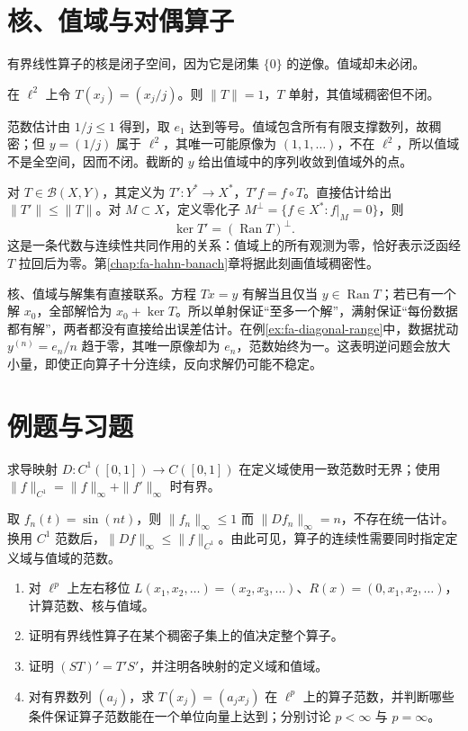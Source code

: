 \documentclass[UTF8,12pt,a4paper,fontset=fandol]{ctexbook}
\begin{document}
\section{核、值域与对偶算子}
有界线性算子的核是闭子空间，因为它是闭集 $\{0\}$ 的逆像。值域却未必闭。
\begin{example}\label{ex:fa-diagonal-range}
在 $\ell^2$ 上令 $T(x_j)=(x_j/j)$。则 $\|T\|=1$，$T$ 单射，其值域稠密但不闭。
\end{example}
\begin{solve}
范数估计由 $1/j\leq1$ 得到，取 $e_1$ 达到等号。值域包含所有有限支撑数列，故稠密；但 $y=(1/j)$ 属于 $\ell^2$，其唯一可能原像为 $(1,1,\ldots)$，不在 $\ell^2$，所以值域不是全空间，因而不闭。截断的 $y$ 给出值域中的序列收敛到值域外的点。
\end{solve}

对 $T\in\mathcal B(X,Y)$，其定义为 $T':Y^*\to X^*$，$T'f=f\circ T$。直接估计给出 $\|T'\|\leq\|T\|$。对 $M\subset X$，定义零化子 $M^\perp=\{f\in X^*:f|_M=0\}$，则
\[
 \ker T'=(\operatorname{Ran}T)^\perp.
\]
这是一条代数与连续性共同作用的关系：值域上的所有观测为零，恰好表示泛函经 $T$ 拉回后为零。第\ref{chap:fa-hahn-banach}章将据此刻画值域稠密性。

核、值域与解集有直接联系。方程 $Tx=y$ 有解当且仅当 $y\in\operatorname{Ran}T$；若已有一个解 $x_0$，全部解恰为 $x_0+\ker T$。所以单射保证“至多一个解”，满射保证“每份数据都有解”，两者都没有直接给出误差估计。在例\ref{ex:fa-diagonal-range}中，数据扰动 $y^{(n)}=e_n/n$ 趋于零，其唯一原像却为 $e_n$，范数始终为一。这表明逆问题会放大小量，即使正向算子十分连续，反向求解仍可能不稳定。

\section{例题与习题}
\begin{example}[求导与定义域范数]
求导映射 $D:C^1([0,1])\to C([0,1])$ 在定义域使用一致范数时无界；使用 $\|f\|_{C^1}=\|f\|_\infty+\|f'\|_\infty$ 时有界。
\end{example}
\begin{solve}
取 $f_n(t)=\sin(nt)$，则 $\|f_n\|_\infty\leq1$ 而 $\|Df_n\|_\infty=n$，不存在统一估计。换用 $C^1$ 范数后，$\|Df\|_\infty\leq\|f\|_{C^1}$。由此可见，算子的连续性需要同时指定定义域与值域的范数。
\end{solve}
\begin{enumerate}
 \item 对 $\ell^p$ 上左右移位 $L(x_1,x_2,\ldots)=(x_2,x_3,\ldots)$、$R(x)=(0,x_1,x_2,\ldots)$，计算范数、核与值域。
 \item 证明有界线性算子在某个稠密子集上的值决定整个算子。
 \item 证明 $(ST)'=T'S'$，并注明各映射的定义域和值域。
 \item 对有界数列 $(a_j)$，求 $T(x_j)=(a_jx_j)$ 在 $\ell^p$ 上的算子范数，并判断哪些条件保证算子范数能在一个单位向量上达到；分别讨论 $p<\infty$ 与 $p=\infty$。
\end{enumerate}
\end{document}

